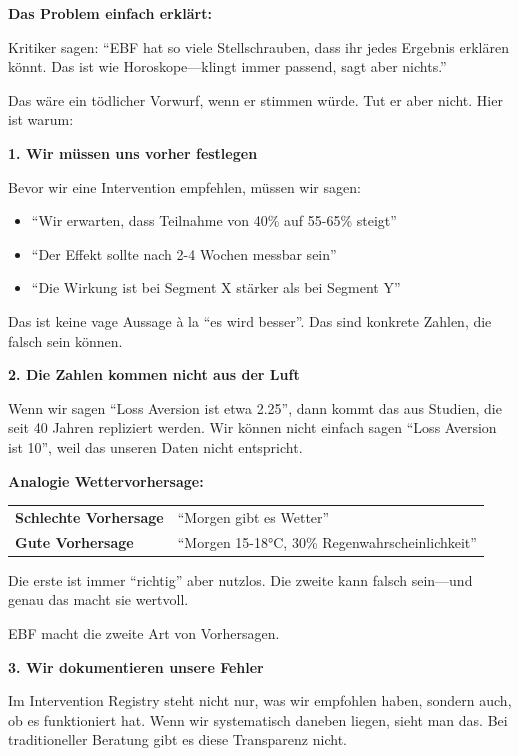 \begin{tcolorbox}[colback=yellow!5!white, colframe=yellow!75!black,
    title=W1-$\mathcal{P}$-L: Lang (Praxis)]

\textbf{Das Problem einfach erklärt:}

Kritiker sagen: ``EBF hat so viele Stellschrauben, dass ihr jedes Ergebnis erklären könnt. Das ist wie Horoskope---klingt immer passend, sagt aber nichts.''

Das wäre ein tödlicher Vorwurf, wenn er stimmen würde. Tut er aber nicht. Hier ist warum:

\textbf{1. Wir müssen uns vorher festlegen}

Bevor wir eine Intervention empfehlen, müssen wir sagen:
\begin{itemize}[nosep]
    \item ``Wir erwarten, dass Teilnahme von 40\% auf 55-65\% steigt''
    \item ``Der Effekt sollte nach 2-4 Wochen messbar sein''
    \item ``Die Wirkung ist bei Segment X stärker als bei Segment Y''
\end{itemize}

Das ist keine vage Aussage à la ``es wird besser''. Das sind konkrete Zahlen, die falsch sein können.

\textbf{2. Die Zahlen kommen nicht aus der Luft}

Wenn wir sagen ``Loss Aversion ist etwa 2.25'', dann kommt das aus Studien, die seit 40 Jahren repliziert werden. Wir können nicht einfach sagen ``Loss Aversion ist 10'', weil das unseren Daten nicht entspricht.

\textbf{Analogie Wettervorhersage:}

\begin{center}
\begin{tabular}{ll}
\textbf{Schlechte Vorhersage} & ``Morgen gibt es Wetter'' \\
\textbf{Gute Vorhersage} & ``Morgen 15-18°C, 30\% Regenwahrscheinlichkeit'' \\
\end{tabular}
\end{center}

Die erste ist immer ``richtig'' aber nutzlos. Die zweite kann falsch sein---und genau das macht sie wertvoll.

EBF macht die zweite Art von Vorhersagen.

\textbf{3. Wir dokumentieren unsere Fehler}

Im Intervention Registry steht nicht nur, was wir empfohlen haben, sondern auch, ob es funktioniert hat. Wenn wir systematisch daneben liegen, sieht man das. Bei traditioneller Beratung gibt es diese Transparenz nicht.


\end{tcolorbox}
